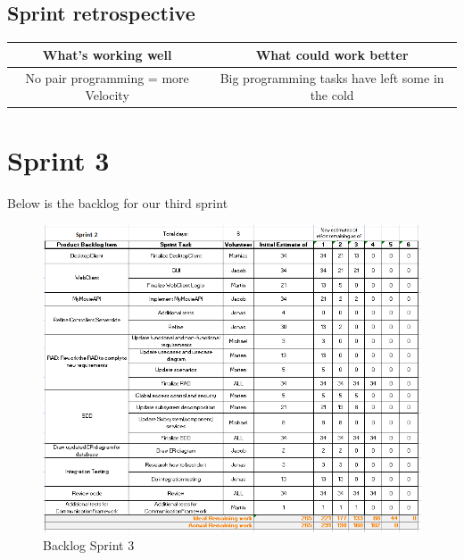 \subsection{Sprint retrospective}

\begin{center}
\begin{tabular}{|c|c|}
\hline \textbf{What's working well} & \textbf{What could work better} \\ 
\hline No pair programming = more Velocity & Big programming tasks have left some in the cold \\ 
\hline 
\end{tabular} 
\end{center}




\newpage
\section{Sprint 3}
\label{chap:Spring 3}
Below is the backlog for our third sprint
\begin{figure}[h]
\includegraphics[scale=0.75]{img/SCRUM/backlogSprint3.png}
\caption{Backlog Sprint 3}
\label{fig:Backlog Sprint 3}
\end{figure}

\newpage
